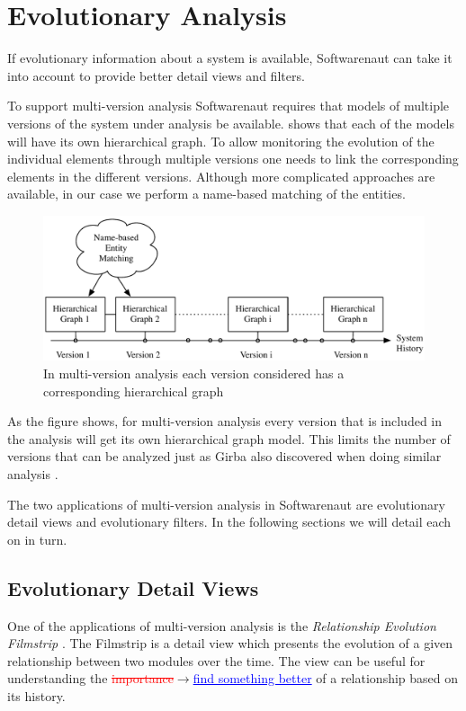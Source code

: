 \documentclass[preprint,12pt]{elsarticle}
\newcommand{\ra}{$\rightarrow$}
\newcommand{\chg}[2]{\textcolor{red}{\sout{#1}}{\ra}\textcolor{blue}{\uline{#2}}} %
\begin{document}
\newpage
\section {Evolutionary Analysis}
\label{sec:evol}

If evolutionary information about a system is available, Softwarenaut can take it into account to provide better detail views and filters.

To support multi-version analysis Softwarenaut requires that models of multiple versions of the system under analysis be available.  shows that each of the models will have its own hierarchical graph. To allow monitoring the evolution of the individual elements through multiple versions one needs to link the corresponding elements in the different versions. Although more complicated approaches are available, in our case we perform a name-based matching of the entities.

\begin{figure}[h]
\begin{center}
\includegraphics[width=\linewidth]{images/MultiVersionAnalysis}
\caption{In multi-version analysis each version considered has a corresponding hierarchical graph}
\end{center}
\end{figure}

As the figure shows, for multi-version analysis every version that is included in the analysis will get its own hierarchical graph model. This limits the number of versions that can be analyzed just as Girba also discovered when doing similar analysis \cite{girba-thesis}.

The two applications of multi-version analysis in Softwarenaut are evolutionary detail views and evolutionary filters. In the following sections we will detail each on in turn.

\newpage
\subsection {Evolutionary Detail Views}
One of the applications of multi-version analysis is the {\em Relationship Evolution Filmstrip} \cite{lungu-relevo}. The Filmstrip is a detail view which presents the evolution of a given relationship between two modules over the time. The view can be useful for understanding the \chg{importance}{find something better} of a relationship based on its history.
\end{document}
